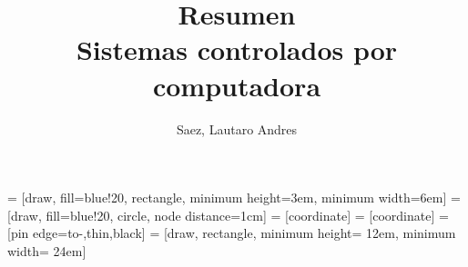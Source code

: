 \documentclass{book}
\title{Resumen \\ Sistemas controlados por computadora}
\author{Saez, Lautaro Andres}
\date{}
\begin{document}
    \maketitle
  

     = [draw, fill=blue!20, rectangle, 
    minimum height=3em, minimum width=6em]
     = [draw, fill=blue!20, circle, node distance=1cm]
     = [coordinate]
     = [coordinate]
     = [pin edge={to-,thin,black}]
     = [draw, rectangle, minimum height= 12em, minimum width= 24em]

    
    
    
\end{document}
